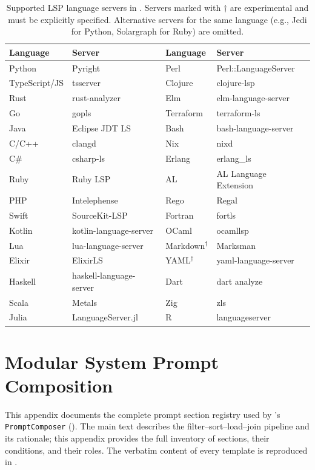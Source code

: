 \begin{table}[h]
\centering
\caption{Supported LSP language servers in \name. Servers marked with $\dagger$ are experimental and must be explicitly specified. Alternative servers for the same language (e.g., Jedi for Python, Solargraph for Ruby) are omitted.}
\label{tab:lsp}
\footnotesize
\begin{tabular}{@{}ll|ll@{}}
\toprule
\textbf{Language} & \textbf{Server} & \textbf{Language} & \textbf{Server} \\
\midrule
Python & Pyright & Perl & Perl::LanguageServer \\
TypeScript/JS & tsserver & Clojure & clojure-lsp \\
Rust & rust-analyzer & Elm & elm-language-server \\
Go & gopls & Terraform & terraform-ls \\
Java & Eclipse JDT LS & Bash & bash-language-server \\
C/C++ & clangd & Nix & nixd \\
C\# & csharp-ls & Erlang & erlang\_ls \\
Ruby & Ruby LSP & AL & AL Language Extension \\
PHP & Intelephense & Rego & Regal \\
Swift & SourceKit-LSP & Fortran & fortls \\
Kotlin & kotlin-language-server & OCaml & ocamllsp \\
Lua & lua-language-server & Markdown$^\dagger$ & Marksman \\
Elixir & ElixirLS & YAML$^\dagger$ & yaml-language-server \\
Haskell & haskell-language-server & Dart & dart analyze \\
Scala & Metals & Zig & zls \\
Julia & LanguageServer.jl & R & languageserver \\
\bottomrule
\end{tabular}
\end{table}


\section{Modular System Prompt Composition}
\label{app:prompts}

This appendix documents the complete prompt section registry used by \name's \texttt{PromptComposer} (). The main text describes the filter--sort--load--join pipeline and its rationale; this appendix provides the full inventory of sections, their conditions, and their roles. The verbatim content of every template is reproduced in .

